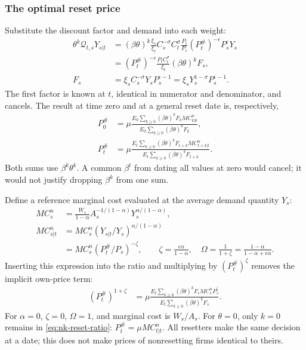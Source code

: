 \subsubsection{The optimal reset price}

Substitute the discount factor and demand into each weight:
\begin{align}
 \theta^k\mathcal Q_{t,s}Y_{s|t}
 &=(\beta\theta)^k\frac{\xi_s}{\xi_t}
       C_s^{-\sigma}C_t^\sigma\frac{P_t}{P_s}
                    (P_t^{\#})^{-\epsilon}P_s^\epsilon Y_s\\
 &=(P_t^{\#})^{-\epsilon}\frac{P_tC_t^\sigma}{\xi_t}
            (\beta\theta)^k F_s,\\
 F_s&=\xi_s C_s^{-\sigma}Y_sP_s^{\epsilon-1}
     =\xi_sY_s^{1-\sigma}P_s^{\epsilon-1}.
\end{align}
The first factor is known at $t$, identical in numerator and denominator, and
cancels. The result at time zero and at a general reset date is, respectively,
\begin{align}
 P_0^{\#}
 &=\mu\frac{E_0\sum_{k\geq0}(\beta\theta)^k F_k MC_{k|0}^n}
                 {E_0\sum_{k\geq0}(\beta\theta)^k F_k},\\
 P_t^{\#}
 &=\mu\frac{E_t\sum_{k\geq0}(\beta\theta)^k F_{t+k}MC_{t+k|t}^n}
                 {E_t\sum_{k\geq0}(\beta\theta)^k F_{t+k}}.
 \label{eq:nk-reset-ratio}
\end{align}
Both sums use $\beta^k\theta^k$. A common $\beta^t$ from dating all values at
zero would cancel; it would not justify dropping $\beta^k$ from one sum.

Define a reference marginal cost evaluated at the average demand quantity $Y_s$:
\begin{align}
 MC_s^n&=\frac{W_s}{1-\alpha}A_s^{-1/(1-\alpha)}Y_s^{\alpha/(1-\alpha)},\\
 MC_{s|t}^n
 &=MC_s^n(Y_{s|t}/Y_s)^{\alpha/(1-\alpha)}\\
 &=MC_s^n(P_t^{\#}/P_s)^{-\zeta},\qquad
 \zeta=\frac{\epsilon\alpha}{1-\alpha},\quad
 \Omega=\frac1{1+\zeta}=\frac{1-\alpha}{1-\alpha+\epsilon\alpha}.
 \label{eq:nk-own-cost}
\end{align}
Inserting this expression into the ratio and multiplying by $(P_t^{\#})^\zeta$
removes the implicit own-price term:
\begin{align}
 (P_t^{\#})^{1+\zeta}
 &=\mu\frac{E_t\sum_{k\geq0}(\beta\theta)^kF_sMC_s^nP_s^\zeta}
                 {E_t\sum_{k\geq0}(\beta\theta)^kF_s}.
\end{align}
For $\alpha=0$, $\zeta=0$, $\Omega=1$, and marginal cost is $W_s/A_s$.
For $\theta=0$, only $k=0$ remains in \eqref{eq:nk-reset-ratio}:
$P_t^{\#}=\mu MC_{t|t}^n$. All resetters make the same decision at a date;
this does not make prices of nonresetting firms identical to theirs.

